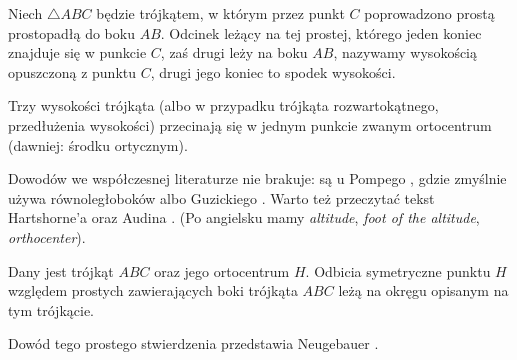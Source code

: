 \begin{definition}[wysokość]
%
    Niech $\triangle ABC$ będzie trójkątem, w którym przez punkt $C$ poprowadzono prostą prostopadłą do boku $AB$.
    Odcinek leżący na tej prostej, którego jeden koniec znajduje się w punkcie $C$, zaś drugi leży na boku $AB$, nazywamy wysokością opuszczoną z punktu $C$, drugi jego koniec to spodek wysokości.
\end{definition}


\begin{proposition}
\label{wysokosci_przecinaja_sie}%
	Trzy wysokości trójkąta (albo w przypadku trójkąta rozwartokątnego, przedłużenia wysokości) przecinają się w jednym punkcie zwanym ortocentrum (dawniej: środku ortycznym).
%
\end{proposition}

Dowodów we współczesnej literaturze nie brakuje: są u Pompego \cite[s. 38]{pompe_2022}, gdzie zmyślnie używa równoległoboków albo Guzickiego \cite[s. 218]{guzicki_2021}.
Warto też przeczytać tekst Hartshorne'a \cite[s. 54]{hartshorne2000} oraz Audina \cite[s. 61]{audin_2003}.
(Po angielsku mamy \emph{altitude}, \emph{foot of the altitude}, \emph{orthocenter}).

\begin{proposition}
    Dany jest trójkąt $ABC$ oraz jego ortocentrum $H$.
    Odbicia symetryczne punktu $H$ względem prostych zawierających boki trójkąta $ABC$ leżą na okręgu opisanym na tym trójkącie.
\end{proposition}

Dowód tego prostego stwierdzenia przedstawia Neugebauer \cite[s. 28]{neugebauer_2018}.